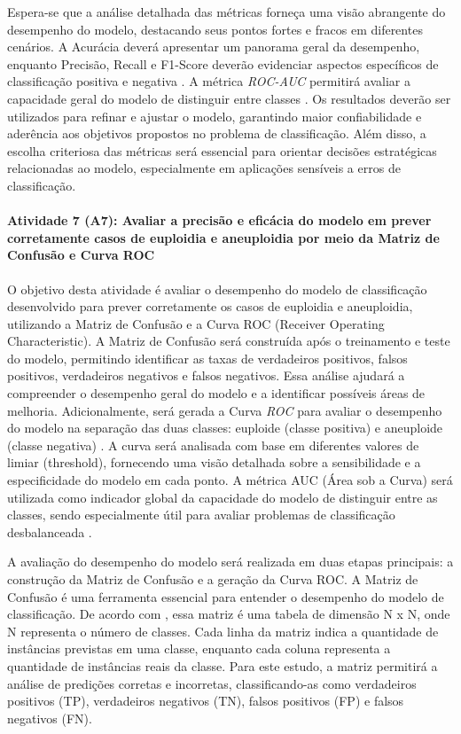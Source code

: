 Espera-se que a análise detalhada das métricas forneça uma visão abrangente do desempenho do modelo, destacando seus pontos fortes e fracos em diferentes cenários. A Acurácia deverá apresentar um panorama geral da desempenho, enquanto Precisão, Recall e F1-Score deverão evidenciar aspectos específicos de classificação positiva e negativa \cite{vilela2022}. A métrica \textit{ROC-AUC} permitirá avaliar a capacidade geral do modelo de distinguir entre classes \cite{vilela2022}. Os resultados deverão ser utilizados para refinar e ajustar o modelo, garantindo maior confiabilidade e aderência aos objetivos propostos no problema de classificação. Além disso, a escolha criteriosa das métricas será essencial para orientar decisões estratégicas relacionadas ao modelo, especialmente em aplicações sensíveis a erros de classificação.

\paragraph{\textbf{Atividade 7 (A7):} Avaliar a precisão e eficácia do modelo em prever corretamente casos de euploidia e aneuploidia  por meio da Matriz de Confusão e Curva ROC}

O objetivo desta atividade é avaliar o desempenho do modelo de classificação desenvolvido para prever corretamente os casos de euploidia e aneuploidia, utilizando a Matriz de Confusão e a Curva ROC (Receiver Operating Characteristic). A Matriz de Confusão será construída após o treinamento e teste do modelo, permitindo identificar as taxas de verdadeiros positivos, falsos positivos, verdadeiros negativos e falsos negativos. Essa análise ajudará a compreender o desempenho geral do modelo e a identificar possíveis áreas de melhoria. Adicionalmente, será gerada a Curva \textit{ROC} para avaliar o desempenho do modelo na separação das duas classes: euploide (classe positiva) e aneuploide (classe negativa) \cite{vilela2022}. A curva será analisada com base em diferentes valores de limiar (threshold), fornecendo uma visão detalhada sobre a sensibilidade e a especificidade do modelo em cada ponto. A métrica AUC (Área sob a Curva) será utilizada como indicador global da capacidade do modelo de distinguir entre as classes, sendo especialmente útil para avaliar problemas de classificação desbalanceada \cite{vilela2022}.

A avaliação do desempenho do modelo será realizada em duas etapas principais: a construção da Matriz de Confusão e a geração da Curva ROC. A Matriz de Confusão é uma ferramenta essencial para entender o desempenho do modelo de classificação. De acordo com , essa matriz é uma tabela de dimensão N x N, onde N representa o número de classes. Cada linha da matriz indica a quantidade de instâncias previstas em uma classe, enquanto cada coluna representa a quantidade de instâncias reais da classe. Para este estudo, a matriz permitirá a análise de predições corretas e incorretas, classificando-as como verdadeiros positivos (TP), verdadeiros negativos (TN), falsos positivos (FP) e falsos negativos (FN). 

